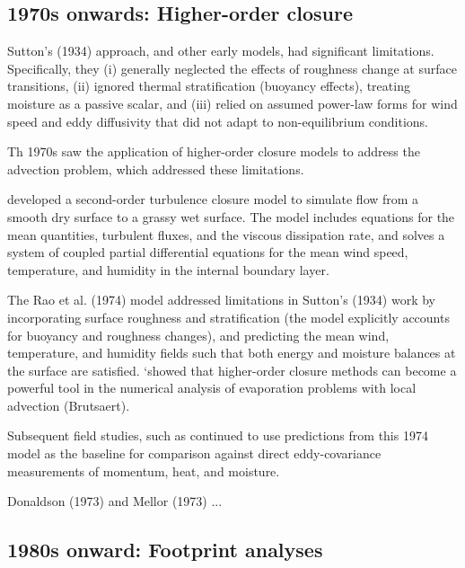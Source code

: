 \documentclass{article}
\begin{document}
     
    \subsection*{1970s onwards: Higher-order closure}

    
     Sutton’s (1934) approach, and other early models, had significant  limitations. Specifically, they (i) generally neglected the effects of roughness change at surface transitions, (ii) ignored thermal stratification (buoyancy effects), treating moisture as a passive scalar, and (iii) relied on assumed power-law forms for wind speed and eddy diffusivity that did not adapt to non-equilibrium conditions.

     Th 1970s saw the application of higher-order closure models to address the advection problem, which addressed these limitations. 


      \citet{rao1974local} developed a second-order turbulence closure model to simulate flow from a smooth dry surface to a grassy wet surface. The model includes equations for the mean quantities, turbulent fluxes, and the viscous dissipation rate, and solves a system of coupled partial differential equations for the mean wind speed, temperature, and humidity in the internal boundary layer.

    The Rao et al. (1974) model addressed limitations in Sutton's (1934) work by incorporating surface roughness and stratification (the model explicitly accounts for buoyancy  and roughness changes), and predicting the mean wind, temperature, and humidity fields such that both energy and moisture balances at the surface are satisfied.
    \citet{rao1974local} `showed that higher-order closure methods can become a powerful tool in the numerical analysis of evaporation problems with local advection (Brutsaert). 

    Subsequent field studies, such as \citet{baldocchi_intra-field_1995} continued to use predictions from this 1974 model as the baseline for comparison against direct eddy-covariance measurements of momentum, heat, and moisture.

     Donaldson (1973) and Mellor (1973) ...  

    \subsection*{1980s onward:  Footprint analyses}
\end{document}
